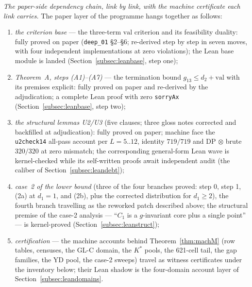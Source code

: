 \emph{The paper-side dependency chain, link by link, with the machine
certificate each link carries.} The paper layer of the programme hangs
together as follows:
\begin{enumerate}[label=\textup{(\arabic*)},leftmargin=2em,itemsep=0.1em]
\item \emph{the criterion base} --- the three-term $\mathrm{val}$ criterion
and its feasibility duality: fully proved on paper (\texttt{deep\_01}
\S2--\S6; re-derived step by step in seven moves, with four independent
implementations at zero violations); the Lean base module is landed
(Section~\ref{subsec:leanbase}, step one);
\item \emph{Theorem~A, steps (A1)--(A7)} --- the termination bound
$g_{13}\le d_2+\mathrm{val}$ with its premises explicit: fully proved on
paper and re-derived by the adjudication; a complete Lean proof with zero
\texttt{sorryAx} (Section~\ref{subsec:leanbase}, step two);
\item \emph{the structural lemmas U2/U3} (five clauses; three gloss notes
corrected and backfilled at adjudication): fully proved on paper; machine
face the \texttt{u2check14} all-pass account per $L=5..12$, identity
$719/719$ and DP$\,\otimes\,$brute $320/320$ at zero mismatch; the
corresponding general-form Lean wave is kernel-checked while its
self-written proofs await independent audit (the caliber of
Section~\ref{subsec:leandebt});
\item \emph{case~2 of the lower bound} (three of the four branches proved:
step 0, step 1, (2a) at $d_1=1$, and (2b), plus the corrected distribution
for $d_1\ge2$), the fourth branch travelling as the reworked patch described
above; the structural premise of the case-2 analysis --- ``$C_1$ is a
$g$-invariant core plus a single point'' --- is kernel-proved
(Section~\ref{subsec:leanstruct});
\item \emph{certification} --- the machine accounts behind
Theorem~\ref{thm:machM} (row tables, censuses, the GL-C domain, the $K^*$
pools, the 621-cell tail, the gap families, the YD pool, the case-2 sweeps)
travel as witness certificates under the inventory below; their Lean shadow
is the four-domain account layer of Section~\ref{subsec:leandomains}.
\end{enumerate}

